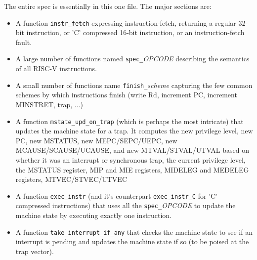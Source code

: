 \documentclass[11pt]{article}
\begin{document}
The entire spec is essentially in this one file.  The major sections
are:
\begin{itemize}

\item A function \verb|instr_fetch| expressing instruction-fetch,
    returning a regular 32-bit instruction, or 'C' compressed 16-bit
    instruction, or an instruction-fetch fault.

\item A large number of functions named \verb|spec_|{\it{}OPCODE}
describing the semantics of all RISC-V instructions.

\item A small number of functions name \verb|finish_|{\it{}scheme}
capturing the few common schemes by which instructions finish (write
Rd, increment PC, increment MINSTRET, trap, ...)

\item A function \verb|mstate_upd_on_trap| (which is perhaps the most
intricate) that updates the machine state for a trap.  It computes the
new privilege level, new PC, new MSTATUS, new MEPC/{\linebreak[0]}SEPC/{\linebreak[0]}UEPC, new
MCAUSE/{\linebreak[0]}SCAUSE/{\linebreak[0]}UCAUSE, and new MTVAL/{\linebreak[0]}STVAL/{\linebreak[0]}UTVAL based on whether
it was an interrupt or synchronous trap, the current privilege level,
the MSTATUS register, MIP and MIE registers, MIDELEG and MEDELEG
registers, MTVEC/{\linebreak[0]}STVEC/{\linebreak[0]}UTVEC

\item A function \verb|exec_instr| (and it's counterpart
\verb|exec_instr_C| for 'C' compressed instructions) that uses all the
\verb|spec_|{\it{}OPCODE} to update the machine state by executing
exactly one instruction.

\item A function \verb|take_interrupt_if_any| that checks the machine
state to see if an interrupt is pending and updates the machine state
if so (to be poised at the trap vector).

\end{itemize}

\end{document}
